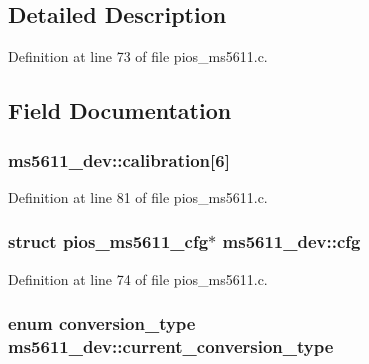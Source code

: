 \subsection{Detailed Description}


Definition at line 73 of file pios\-\_\-ms5611.\-c.



\subsection{Field Documentation}
\hypertarget{structms5611__dev_a70397164fa20e861a6d63d2662398656}{
\subsubsection[{calibration}]{ ms5611\-\_\-dev\-::calibration\mbox{[}6\mbox{]}}}\label{structms5611__dev_a70397164fa20e861a6d63d2662398656}


Definition at line 81 of file pios\-\_\-ms5611.\-c.

\hypertarget{structms5611__dev_a574b60b9bc78dd7806922d127ef46f02}{
\subsubsection[{cfg}]{\setlength{\rightskip}{0pt plus 5cm}struct {\bf pios\-\_\-ms5611\-\_\-cfg}$\ast$ ms5611\-\_\-dev\-::cfg}}\label{structms5611__dev_a574b60b9bc78dd7806922d127ef46f02}


Definition at line 74 of file pios\-\_\-ms5611.\-c.

\hypertarget{structms5611__dev_aa8a4e5f38a07817e999f55e10263a13b}{
\subsubsection[{current\-\_\-conversion\-\_\-type}]{\setlength{\rightskip}{0pt plus 5cm}enum {\bf conversion\-\_\-type} ms5611\-\_\-dev\-::current\-\_\-conversion\-\_\-type}}\label{structms5611__dev_aa8a4e5f38a07817e999f55e10263a13b}


